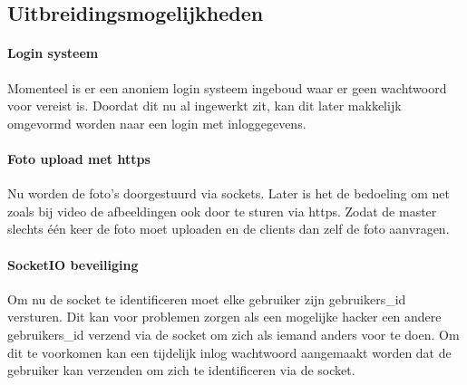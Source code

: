\subsection{Uitbreidingsmogelijkheden}
\paragraph{Login systeem} Momenteel is er een anoniem login systeem ingeboud waar er geen wachtwoord voor vereist is. Doordat dit nu al ingewerkt zit, kan dit later makkelijk omgevormd worden naar een login met inloggegevens.
\paragraph{Foto upload met https} Nu worden de foto's doorgestuurd via sockets. Later is het de bedoeling om net zoals bij video de afbeeldingen ook door te sturen via https. Zodat de master slechts één keer de foto moet uploaden en de clients dan zelf de foto aanvragen.
\paragraph{SocketIO beveiliging} Om nu de socket te identificeren moet elke gebruiker zijn gebruikers\_id versturen. Dit kan voor problemen zorgen als een mogelijke hacker een andere gebruikers\_id verzend via de socket om zich als iemand anders voor te doen. Om dit te voorkomen kan een tijdelijk inlog wachtwoord aangemaakt worden dat de gebruiker kan verzenden om zich te identificeren via de socket. 
 
 
 
 
 